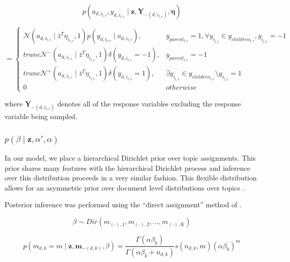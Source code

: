 \documentclass{article}
\begin{document}
\[
p\left(a_{d,i_{l,c}},y_{d,i_{l,c}}\mid\mathbf{z},\mathbf{Y}_{-\left(d,i_{l,c}\right)},\mathbf{\eta}\right)\]


\begin{equation}
=\begin{cases}
\mathcal{N}\left(a_{d,i_{l,c}}\mid\bar{z}^{T}\eta_{i_{l,c}},1\right)p\left(y_{d,i_{l,c}}\mid a_{d,i_{l,c}}\right), & y_{parent_{l,c}}=1,\forall y_{i_{\hat{l},\hat{c}}}\in y_{children_{l,c}},y_{i_{\hat{l},\hat{c}}}=-1\\
trunc\mathcal{N}^{-}\left(a_{d,i_{l,c}}\mid\bar{z}^{T}\eta_{i_{l,c}},1\right)\delta\left(y_{d,i_{l,c}}=-1\right), & y_{parent_{l,c}}=-1\\
trunc\mathcal{N}^{+}\left(a_{d,i_{l,c}}\mid\bar{z}^{T}\eta_{i_{l,c}},1\right)\delta\left(y_{d,i_{l,c}}=1\right), & \exists y_{i_{\hat{l},\hat{c}}}\in y_{children_{l,c}}\setminus y_{i_{\hat{l},\hat{c}}}=1\\
0 & otherwise\end{cases}\end{equation}


where $\mathbf{Y}_{-\left(d,i_{l,c}\right)}$ denotes all of the response
variables excluding the response variable being sampled.


\subsubsection{$p\left(\beta\mid\mathbf{z},\alpha',\alpha\right)$}

In our model, we place a hierarchical Dirichlet prior over topic assignments.
This prior shares many features with the hierarchical Dirichlet process
and inference over this distribution proceeds in a very similar fashion.
This flexible distribution allows for an asymmetric prior over document
level distributions over topics \citet{WallachMiMc2009}.

Posterior inference was performed using the {}``direct assignment''
method of \citet{TehJorBea2006}.

\begin{equation}
\beta\sim Dir\left(m_{\left(\cdot\right),1},m_{\left(\cdot\right),2},\ldots,m_{\left(\cdot\right),K}\right)\end{equation}


\begin{equation}
p\left(m_{d,k}=m\mid\mathbf{z},\mathbf{m}_{-\left(d,k\right)},\beta\right)=\frac{\Gamma\left(\alpha\beta_{k}\right)}{\Gamma\left(\alpha\beta_{k}+n_{d,k}\right)}s\left(n_{d,k},m\right)\left(\alpha\beta_{k}\right)^{m}\end{equation}
\end{document}
